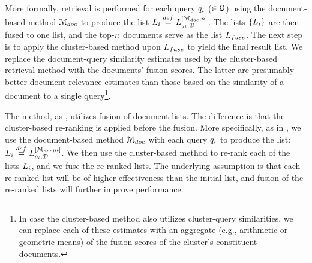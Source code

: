 More formally, retrieval is performed for each query $q_i$ ($\in
{\mathcal Q}$) using the document-based method ${\mathcal M_{doc}}$ to produce
the list $L_i \stackrel{def}{=}
L_{q_i,{\mathcal D}}^{[{\mathcal M_{doc}};n]}$. The lists
$\{L_i\}$ are then fused to one list, and the top-$n$
documents serve as the list $L_{fuse}$.  The next step is to
apply the cluster-based method upon $L_{fuse}$ to yield the
final result list. We replace the document-query similarity estimates used by the cluster-based retrieval method with the documents' fusion scores. The latter are presumably better document relevance estimates than those based on the similarity of a document to a single query\footnote{In case the cluster-based method also utilizes cluster-query similarities, we can replace each of these estimates with an aggregate (e.g., arithmetic or geometric means) of the fusion scores of the cluster's constituent documents.}.



\myparagraph{\clustFuseNoR} The \firstmention{\clustFuseNoR} method,
as \fuseClust, utilizes fusion of document lists. The difference is
that the cluster-based re-ranking is applied before the
fusion. More specifically, as in \fuseClust, we use the document-based method ${\mathcal M_{doc}}$ with each query $q_i$ to produce
the list: $L_i \stackrel{def}{=} L_{q_i,{\mathcal D}}^{[{\mathcal M_{doc}};n]}$. We then use the cluster-based method to re-rank each of the lists $L_i$, and we fuse the re-ranked lists.
The underlying assumption is that each re-ranked list will be of higher effectiveness than the initial list, and fusion of the re-ranked lists will further improve performance.

